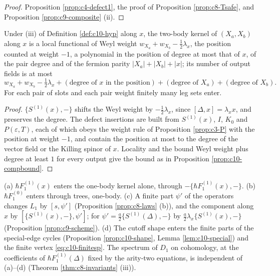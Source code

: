 \begin{proof}
Proposition \ref{prop:c4-defect1}, the proof of Proposition \ref{prop:c8-Tsafe}, and Proposition \ref{prop:c9-composite} (ii).
\end{proof}

\begin{proposition}
\label{prop:c10-bound1}
Under (iii) of Definition \ref{def:c10-hyp} along $x$, the two-body kernel of $(X_a,X_b)$ along $x$ is a local functional of Weyl weight $w_{X_a}+w_{X_b}-\tfrac12\lambda_x$, the position counted at weight $-1$, a polynomial in the position of degree at most that of $x$, of the pair degree and of the fermion parity $|X_a|+|X_b|+|x|$; its number of output fields is at most
\[
w_{X_a}+w_{X_b}-\tfrac12\lambda_x+(\text{degree of }x\text{ in the position})+(\text{degree of }X_a)+(\text{degree of }X_b).
\]
For each pair of slots and each pair weight finitely many leg sets enter.
\end{proposition}

\begin{proof}
$\{S^{(1)}(x),-\}$ shifts the Weyl weight by $-\tfrac12\lambda_x$, since $[\Delta,x]=\lambda_xx$, and preserves the degree. The defect insertions are built from $S^{(1)}(x)$, $I$, $K_0$ and $P(\varepsilon,T)$, each of which obeys the weight rule of Proposition \ref{prop:c3-P} with the position at weight $-1$, and contain the position at most to the degree of the vector field or the Killing spinor of $x$. Locality and the bound Weyl weight plus degree at least $1$ for every output give the bound as in Proposition \ref{prop:c10-compbound}.
\end{proof}

\begin{remark}
\label{rem:c10-scheme1}
(a) $\hbar F_1^{(1)}(x)$ enters the one-body kernel alone, through $-\{\hbar F_1^{(1)}(x),-\}$. (b) $\hbar F_1^{(0)}$ enters through trees, one-body. (c) A finite part $\psi'$ of the operators changes $L_1$ by $[s,\psi']$ (Proposition \ref{prop:c8-laws} (b)), and the component along $x$ by $[\{S^{(1)}(x),-\},\psi']$; for $\psi'=\tfrac a2\{S^{(1)}(\Delta),-\}$ by $\tfrac a2\lambda_x\{S^{(1)}(x),-\}$ (Proposition \ref{prop:c9-scheme}). (d) The cutoff shape enters the finite parts of the special-edge cycles (Proposition \ref{prop:c10-shape}, Lemma \ref{lem:c10-special}) and the finite vertex \eqref{eq:c10-finitesp}. The spectrum of $D_1$ on cohomology, at the coefficients of $\hbar F_1^{(1)}(\Delta)$ fixed by the arity-two equations, is independent of (a)--(d) (Theorem \ref{thm:c8-invariants} (iii)).
\end{remark}

